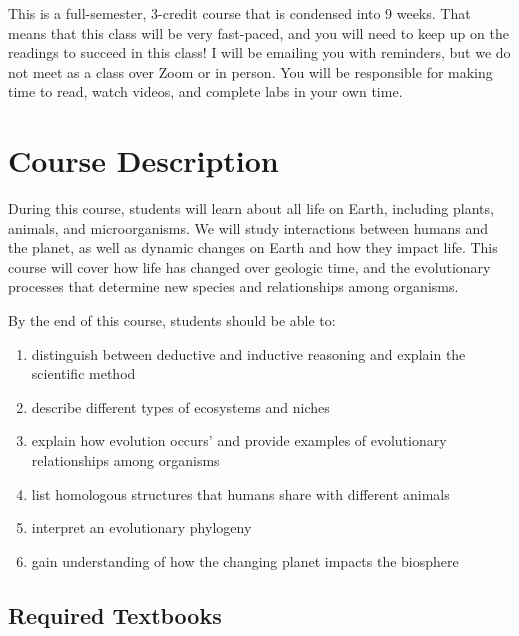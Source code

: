\documentclass{tufte-handout}
\begin{document}
\begin{fullwidth}

\color{blue}  This is a full-semester, 3-credit course that is condensed into 9 weeks. That means that this class will be very fast-paced, and you will need to keep up on the readings to succeed in this class!  I will be emailing you with reminders, but we do not meet as a class over Zoom or in person. You will be responsible for making time to read, watch videos, and complete labs in your own time.

\color{black}


\section{Course Description}

During this course, students will learn about all life on Earth, including plants, animals, and microorganisms. We will study interactions between humans and the planet, as well as dynamic changes on Earth and how they impact life. This course will cover how life has changed over geologic time, and the evolutionary processes that determine new species and relationships among organisms.


By the end of this course, students should be able to:  

\begin{enumerate}
	\item distinguish between deductive and inductive reasoning and explain the scientific method
	\item describe different types of ecosystems and niches
	\item explain how evolution occurs’ and provide examples of evolutionary relationships among organisms
	\item list homologous structures that humans share with different animals
	\item interpret an evolutionary phylogeny
	\item gain understanding of how the changing planet impacts the biosphere
\end{enumerate}

\subsection{Required Textbooks}


\end{fullwidth}
\end{document}
